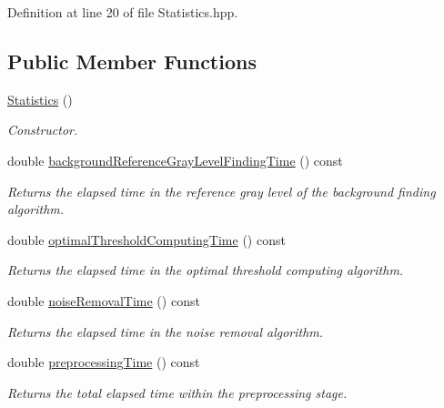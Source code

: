 Definition at line 20 of file Statistics.hpp.\subsection*{Public Member Functions}
\begin{CompactItemize}
\item 
\hyperlink{class_statistics_60ddd90a571ed4c3ce8c0f6317a36d63}{Statistics} ()
\begin{CompactList}\small\item\em Constructor. \item\end{CompactList}\item 
double \hyperlink{class_statistics_565e90b1940d12bb2a2661f6dcea230d}{backgroundReferenceGrayLevelFindingTime} () const 
\begin{CompactList}\small\item\em Returns the elapsed time in the reference gray level of the background finding algorithm. \item\end{CompactList}\item 
double \hyperlink{class_statistics_ca10ccbc4137e9ad184ff6dc9a3e5a46}{optimalThresholdComputingTime} () const 
\begin{CompactList}\small\item\em Returns the elapsed time in the optimal threshold computing algorithm. \item\end{CompactList}\item 
double \hyperlink{class_statistics_25b35c7f7f33d55ee86f4e7ba6cd0c48}{noiseRemovalTime} () const 
\begin{CompactList}\small\item\em Returns the elapsed time in the noise removal algorithm. \item\end{CompactList}\item 
double \hyperlink{class_statistics_d88deb57349fedd7035ccffa06b4859b}{preprocessingTime} () const 
\begin{CompactList}\small\item\em Returns the total elapsed time within the preprocessing stage. \item\end{CompactList}\end{CompactItemize}
